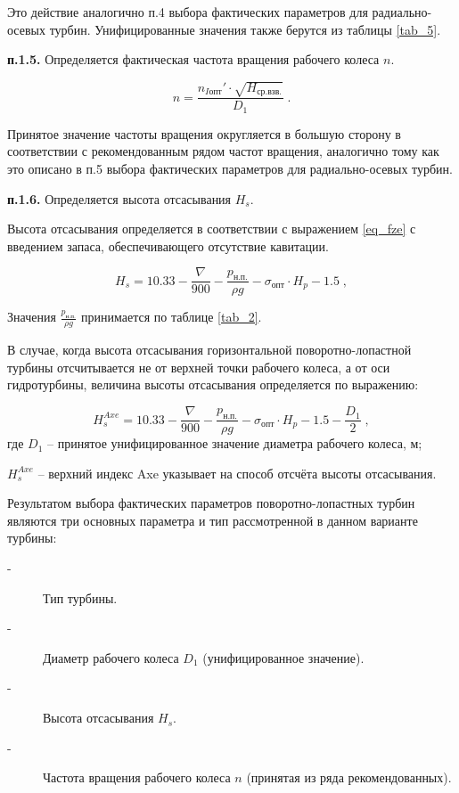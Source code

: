 \vspace{0.5cm}

Это действие аналогично п.4 выбора фактических параметров для радиально-осевых турбин. Унифицированные значения  также берутся из таблицы \ref{tab_5}.


\vspace{0.5cm}
\textbf{п.1.5.} Определяется фактическая частота вращения рабочего колеса $n$.

$$
   n = \frac{n_{I\text{опт}}' \cdot \sqrt{H_{\text{ср.взв.}}} }{D_1} \; .
$$

\vspace{0.5cm}

Принятое значение частоты вращения округляется в большую сторону в соответствии с рекомендованным рядом частот вращения, аналогично тому как это описано в п.5 выбора фактических параметров для радиально-осевых турбин.




\vspace{0.5cm}
\textbf{п.1.6.} Определяется высота отсасывания $H_s$.


Высота отсасывания определяется в соответствии с выражением \ref{eq_fze} с введением запаса, обеспечивающего отсутствие кавитации.

$$
   H_s = 10.33 - \frac{\nabla}{900} - \frac{p_{\text{н.п.}}}{\rho g} - \sigma_{\text{опт}} \cdot H_p - 1.5  \; ,
$$

Значения $\frac{p_{\text{н.п.}}}{\rho g}$ принимается по таблице \ref{tab_2}.

\vspace{0.5cm}

В случае, когда высота отсасывания горизонтальной поворотно-лопастной турбины отсчитывается не от верхней точки рабочего колеса, а от оси гидротурбины, величина высоты отсасывания определяется по выражению:

$$
   H_s^{Axe} = 10.33 - \frac{\nabla}{900} - \frac{p_{\text{н.п.}}}{\rho g} - \sigma_{\text{опт}} \cdot H_p - 1.5 - \frac{D_1}{2} \; ,
$$
где $D_1$ -- принятое унифицированное значение диаметра рабочего колеса, м;

$H_s^{Axe}$ -- верхний индекс Axe указывает на способ отсчёта высоты отсасывания.

\vspace{1cm}

Результатом выбора фактических параметров поворотно-лопастных турбин являются три основных параметра и тип рассмотренной в данном варианте турбины:

\begin{description}
\item[-] Тип турбины. 
\item[-] Диаметр рабочего колеса $D_1$ (унифицированное значение).
\item[-] Высота отсасывания $H_s$.
\item[-] Частота вращения рабочего колеса $n$ (принятая из ряда рекомендованных).
\end{description}










